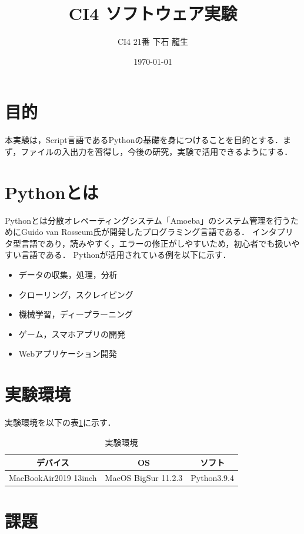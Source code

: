 \documentclass[a4paper,11pt]{jsarticle}
\begin{document}
\title{CI4 ソフトウェア実験}
\author{CI4 21番 下石 龍生}
\date{\today}
\maketitle


\section{目的}
本実験は，Script言語であるPythonの基礎を身につけることを目的とする．まず，ファイルの入出力を習得し，今後の研究，実験で活用できるようにする．

\section{Pythonとは}
Python\cite{python}とは分散オレペーティングシステム「Amoeba」のシステム管理を行うためにGuido van Rosseum氏が開発したプログラミング言語である．
インタプリタ型言語であり，読みやすく，エラーの修正がしやすいため，初心者でも扱いやすい言語である．
Pythonが活用されている例を以下に示す．
\begin{itemize}
  \item データの収集，処理，分析
  \item クローリング，スクレイピング
  \item 機械学習，ディープラーニング
  \item ゲーム，スマホアプリの開発
  \item Webアプリケーション開発
\end{itemize}


\section{実験環境}
実験環境を以下の表\ref{em}に示す．
\begin{table}[H]
  \begin{center}
    \caption{実験環境}
    \begin{tabular}{|c|c|c|}  \hline 
      デバイス &  OS & ソフト \\ \hline 
      MacBookAir2019 13inch &  MacOS BigSur 11.2.3 & Python3.9.4 \\ \hline
    \end{tabular}
    \label{em}
  \end{center}
\end{table}

\section{課題}
\end{document}
